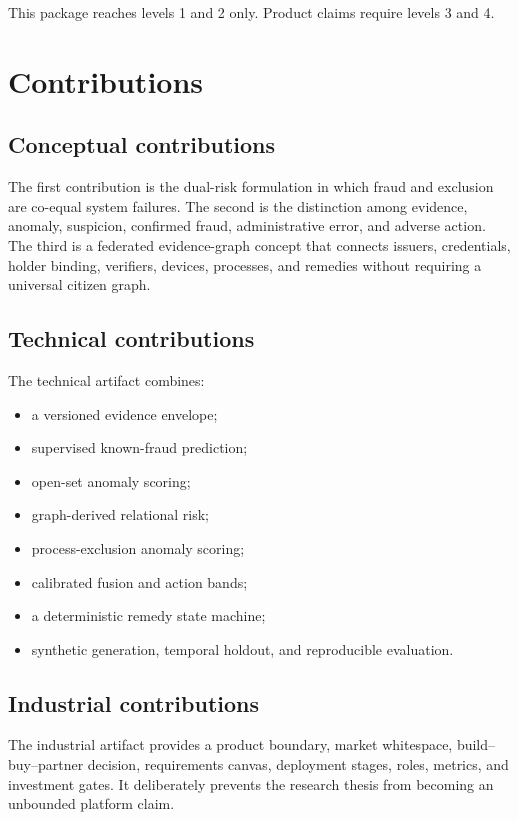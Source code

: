 This package reaches levels 1 and 2 only. Product claims require levels 3 and 4.

\section{Contributions}

\subsection{Conceptual contributions}

The first contribution is the dual-risk formulation in which fraud and exclusion are co-equal system failures. The second is the distinction among evidence, anomaly, suspicion, confirmed fraud, administrative error, and adverse action. The third is a federated evidence-graph concept that connects issuers, credentials, holder binding, verifiers, devices, processes, and remedies without requiring a universal citizen graph.

\subsection{Technical contributions}

The technical artifact combines:

\begin{itemize}
\item a versioned evidence envelope;
\item supervised known-fraud prediction;
\item open-set anomaly scoring;
\item graph-derived relational risk;
\item process-exclusion anomaly scoring;
\item calibrated fusion and action bands;
\item a deterministic remedy state machine;
\item synthetic generation, temporal holdout, and reproducible evaluation.
\end{itemize}

\subsection{Industrial contributions}

The industrial artifact provides a product boundary, market whitespace, build--buy--partner decision, requirements canvas, deployment stages, roles, metrics, and investment gates. It deliberately prevents the research thesis from becoming an unbounded platform claim.

